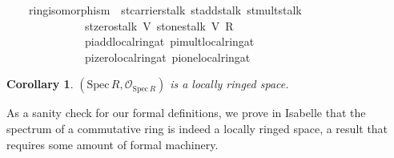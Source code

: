\documentclass[12pt]{scrartcl}
\newtheorem{cor}[proposition]{Corollary}
\def\spec{\text{Spec}\,R}
\begin{document}
\begin{isabelle}
\ \ \ {\isachardoublequoteopen}{\isasymexists}{\isasymphi}{\isachardot}{\kern0pt}\ ring{\isacharunderscore}{\kern0pt}isomorphism\ {\isasymphi}\ st{\isachardot}{\kern0pt}carrier{\isacharunderscore}{\kern0pt}stalk\ st{\isachardot}{\kern0pt}add{\isacharunderscore}{\kern0pt}stalk\ st{\isachardot}{\kern0pt}mult{\isacharunderscore}{\kern0pt}stalk\ \isanewline
\ \ \ \ \ \ \ \ \ \ \ \ \ \ {\isacharparenleft}{\kern0pt}st{\isachardot}{\kern0pt}zero{\isacharunderscore}{\kern0pt}stalk\ V{\isacharparenright}{\kern0pt}\ {\isacharparenleft}{\kern0pt}st{\isachardot}{\kern0pt}one{\isacharunderscore}{\kern0pt}stalk\ V{\isacharparenright}{\kern0pt}\ {\isacharparenleft}{\kern0pt}R\ \isactrlbsub {\isasympp}\ {\isacharparenleft}{\kern0pt}{\isacharplus}{\kern0pt}{\isacharparenright}{\kern0pt}\ {\isacharparenleft}{\kern0pt}{\isasymcdot}{\isacharparenright}{\kern0pt}\ {\isasymzero}\isactrlesub {\isacharparenright}{\kern0pt}\ \isanewline
\ \ \ \ \ \ \ \ \ \ \ \ \ \ {\isacharparenleft}{\kern0pt}pi{\isachardot}{\kern0pt}add{\isacharunderscore}{\kern0pt}local{\isacharunderscore}{\kern0pt}ring{\isacharunderscore}{\kern0pt}at{\isacharparenright}{\kern0pt}\ {\isacharparenleft}{\kern0pt}pi{\isachardot}{\kern0pt}mult{\isacharunderscore}{\kern0pt}local{\isacharunderscore}{\kern0pt}ring{\isacharunderscore}{\kern0pt}at{\isacharparenright}{\kern0pt}\ \isanewline
\ \ \ \ \ \ \ \ \ \ \ \ \ \ {\isacharparenleft}{\kern0pt}pi{\isachardot}{\kern0pt}zero{\isacharunderscore}{\kern0pt}local{\isacharunderscore}{\kern0pt}ring{\isacharunderscore}{\kern0pt}at{\isacharparenright}{\kern0pt}\ {\isacharparenleft}{\kern0pt}pi{\isachardot}{\kern0pt}one{\isacharunderscore}{\kern0pt}local{\isacharunderscore}{\kern0pt}ring{\isacharunderscore}{\kern0pt}at{\isacharparenright}{\kern0pt}{\isachardoublequoteclose}\isanewline
\isanewline
{}
\end{isabelle}
	
\begin{cor}
	$(\text{Spec}\,R, \mathscr{O}_{\spec})$ is a locally ringed space.
\end{cor}

As a sanity check for our formal definitions, we prove in Isabelle that the spectrum of a commutative ring is indeed a locally ringed space, a result that requires some amount of formal machinery.
\end{document}
